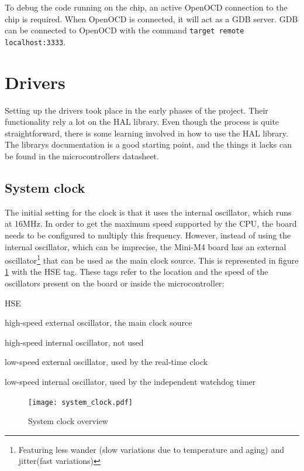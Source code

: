 To debug the code running on the chip, an active OpenOCD connection to the chip
is required. When OpenOCD is connected, it will act as a GDB server. GDB can
be connected to OpenOCD with the command \texttt{target remote localhost:3333}.

\section{Drivers}

Setting up the drivers took place in the early phases of the project. Their
functionality rely a lot on the HAL library. Even though the process is
quite straightforward, there is some learning involved in how to use the
HAL library. The library\textquotesingle s documentation is a good starting
point, and the things it lacks can be found in the 
microcontroller\textquotesingle s datasheet.

\subsection{System clock}
The initial setting for the clock is that it uses the internal oscillator,
which runs at 16MHz. In order to get the maximum speed supported by the
CPU, the board needs to be configured to multiply this frequency.
However, instead of using the internal oscillator, which can be imprecise, 
the Mini-M4 
board has an external oscillator\footnote{Featuring less wander (slow
 variations due to temperature and aging) and jitter(fast variations)} 
that can be used as the main clock 
source. This is represented in figure \ref{fig:system_clock} with the HSE
tag. These tags refer to the location and the speed of the oscillators
present on the board or inside the microcontroller:

\begin{labeling}{HSE}
	\item[\textbf{HSE}]
		high-speed external oscillator, the main clock source
	\item[\textbf{HSI}]
		high-speed internal oscillator, not used
	\item[\textbf{LSE}]
		low-speed external oscillator, used by the real-time clock
	\item[\textbf{LSI}]
		low-speed internal oscillator, used by the independent watchdog
		timer
\end{labeling}

\begin{figure}[H]
\centering
\texttt{[image: system\_clock.pdf]}
\caption{System clock overview \cite{reference_manual_74}}
\label{fig:system_clock}
\end{figure}

